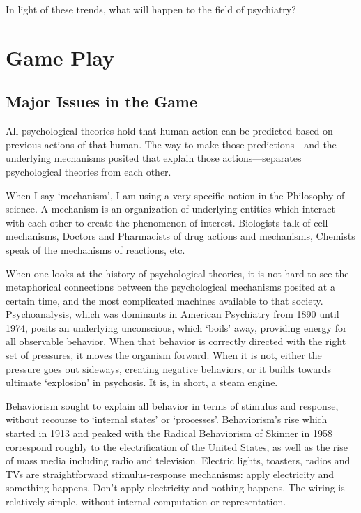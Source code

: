 \begin{refsection}
\begin{enumerate}
\end{enumerate}

In light of these trends, what will happen to the field of psychiatry?

\pagebreak 

\chapter{Game Play}
\label{gameplay}

\section{Major Issues in the Game}
\label{majorissuesinthegame}

All psychological theories hold that human action can be predicted based on previous actions of that human. The way to make those predictions---and the underlying mechanisms posited that explain those actions---separates psychological theories from each other.

When I say `mechanism', I am using a very specific notion in the Philosophy of science. A mechanism is an organization of underlying entities which interact with each other to create the phenomenon of interest. Biologists talk of cell mechanisms, Doctors and Pharmacists of drug actions and mechanisms, Chemists speak of the mechanisms of reactions, etc. 

When one looks at the history of psychological theories, it is not hard to see the metaphorical connections between the psychological mechanisms posited at a certain time, and the most complicated machines available to that society. Psychoanalysis, which was dominants in American Psychiatry from 1890 until 1974, posits an underlying unconscious, which `boils' away, providing energy for all observable behavior. When that behavior is correctly directed with the right set of pressures, it moves the organism forward. When it is not, either the pressure goes out sideways, creating negative behaviors, or it builds towards ultimate `explosion' in psychosis. It is, in short, a steam engine.

Behaviorism sought to explain all behavior in terms of stimulus and response, without recourse to `internal states' or `processes'. Behaviorism's rise which started in 1913 and peaked with the Radical Behaviorism of Skinner in 1958 correspond roughly to the electrification of the United States, as well as the rise of mass media including radio and television. Electric lights, toasters, radios and TVs are straightforward stimulus-response mechanisms: apply electricity and something happens. Don't apply electricity and nothing happens. The wiring is relatively simple, without internal computation or representation. 


\end{refsection}
